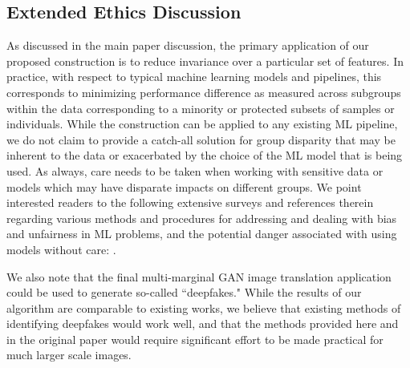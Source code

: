 \subsection{Extended Ethics Discussion}

As discussed in the main paper discussion,
the primary application of our proposed construction is to reduce invariance over a particular set of features. In practice, with respect to typical machine learning models and pipelines, 
this corresponds to minimizing performance difference as measured across subgroups within the data corresponding to a minority or protected subsets of samples or individuals.
While the construction can be applied to 
any existing ML pipeline,
we do not claim to provide a catch-all solution for group disparity that may be inherent to the data or exacerbated by the choice of the ML model that is being used.
As always, care needs to be taken when working with sensitive data or models which may have disparate impacts on different groups.
We point interested readers to the following extensive surveys and references therein regarding various methods and procedures for addressing and dealing with bias and unfairness in ML problems, and the potential danger associated with using models without care: \citep{mehrabi2021survey,leavy2018gender,o2016weapons,d2017conscientious,rakova2021responsible}.

We also note that the final multi-marginal GAN image translation application could be used to generate so-called ``deepfakes." 
While the results of our algorithm are comparable to existing works, we believe that existing methods of identifying deepfakes would work well, and that the methods provided here and in the original  paper \cite{cao2019multi} would require significant effort to be made practical for much larger scale images.